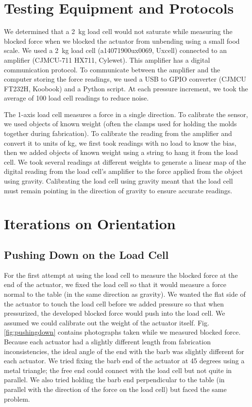 \clearpage
\section{Testing Equipment and Protocols}

We determined that a 2~kg load cell would not saturate while measuring the blocked force when we blocked the actuator from unbending using a small food scale. We used a 2~kg load cell (a14071900ux0069, Uxcell) connected to an amplifier (CJMCU-711 HX711, Cylewet). This amplifier has a digital communication protocol. To communicate between the amplifier and the computer storing the force readings, we used a USB to GPIO converter (CJMCU FT232H, Koobook) and a Python script. At each pressure increment, we took the average of 100 load cell readings to reduce noise. 

The 1-axis load cell measures a force in a single direction. To calibrate the sensor, we used objects of known weight (often the clamps used for holding the molds together during fabrication). To calibrate the reading from the amplifier and convert it to units of kg, we first took readings with no load to know the bias, then we added objects of known weight using a string to hang it from the load cell. We took several readings at different weights to generate a linear map of the digital reading from the load cell's amplifier to the force applied from the object using gravity. Calibrating the load cell using gravity meant that the load cell must remain pointing in the direction of gravity to ensure accurate readings. 

\section{Iterations on Orientation}

\subsection{Pushing Down on the Load Cell}

For the first attempt at using the load cell to measure the blocked force at the end of the actuator, we fixed the load cell so that it would measure a force normal to the table (in the same direction as gravity). We wanted the flat side of the actuator to touch the load cell before we added pressure so that when pressurized, the developed blocked force would push into the load cell. We assumed we could calibrate out the weight of the actuator itself. Fig. \ref{fig:pushingdown} contains photographs taken while we measured blocked force. Because each actuator had a slightly different length from fabrication inconsistencies, the ideal angle of the end with the barb was slightly different for each actuator. We tried fixing the barb end of the actuator at 45 degrees using a metal triangle; the free end could connect with the load cell but not quite in parallel. We also tried holding the barb end perpendicular to the table (in parallel with the direction of the force on the load cell) but faced the same problem. 

